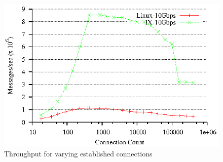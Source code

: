 

\begin{figure}
\centering    \includegraphics{figs/connscaling-throughput.eps}
\caption{Throughput for varying established connections}
\label{fig:connscaling}
\end{figure}
